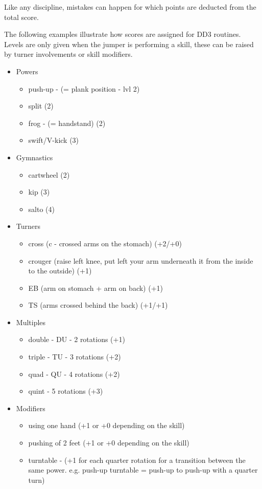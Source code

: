 Like any discipline, mistakes can happen for which points are deducted from the total score.

The following examples illustrate how scores are assigned for DD3 routines. Levels are only given when the jumper is performing a skill, these can be raised by turner involvements or skill modifiers.

\begin{itemize}
    \item Powers
    \begin{itemize}
        \item push-up - (= plank position - lvl 2)
        \item split (2)
        \item frog - (= handstand) (2)
        \item swift/V-kick (3)
    \end{itemize}
    \item Gymnastics
    \begin{itemize}
        \item cartwheel (2)
        \item kip (3)
        \item salto (4)
    \end{itemize}
    \item Turners
    \begin{itemize}
        \item cross (c - crossed arms on the stomach) (+2/+0)
        \item crouger (raise left knee, put left your arm underneath it from the inside to the outside) (+1)
        \item EB (arm on stomach + arm on back) (+1)
        \item TS (arms crossed behind the back) (+1/+1)
    \end{itemize}
    \item Multiples
    \begin{itemize}
        \item double - DU - 2 rotations (+1)
        \item triple - TU - 3 rotations (+2)
        \item quad - QU - 4 rotations (+2)
        \item quint - 5 rotations (+3)
    \end{itemize}
    \item Modifiers
    \begin{itemize}
        \item using one hand (+1 or +0 depending on the skill)
        \item pushing of 2 feet (+1 or +0 depending on the skill)
        \item turntable - (+1 for each quarter rotation for a transition between the same power. e.g. push-up turntable = push-up to push-up with a quarter turn)
    \end{itemize}
\end{itemize}

